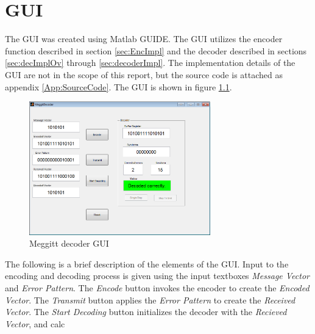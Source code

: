 \documentclass[Main]{subfiles}
\begin{document}
\chapter{GUI}
\label{cha:gui}

The GUI was created using Matlab GUIDE. The GUI utilizes the encoder function described in section \ref{sec:EncImpl} and the decoder described in sections \ref{sec:decImplOv} through \ref{sec:decoderImpl}. The implementation details of the GUI are not in the scope of this report, but the source code is attached as appendix \ref{App:SourceCode}.
The GUI is shown in figure \ref{fig:meggittGUI}.

\begin{figure}[h]
    \centering
    \includegraphics[width=0.7\textwidth]{figures/gui}
    \caption{Meggitt decoder GUI}
    \label{fig:meggittGUI}
\end{figure}

The following is a brief description of the elements of the GUI. Input to the encoding and decoding process is given using the input textboxes \textit{Message Vector} and \textit{Error Pattern}. The \textit{Encode} button invokes the encoder to create the \textit{Encoded Vector}. The \textit{Transmit} button applies the \textit{Error Pattern} to create the \textit{Received Vector}. The \textit{Start Decoding} button initializes the decoder with the \textit{Recieved Vector}, and calc 
\end{document}
